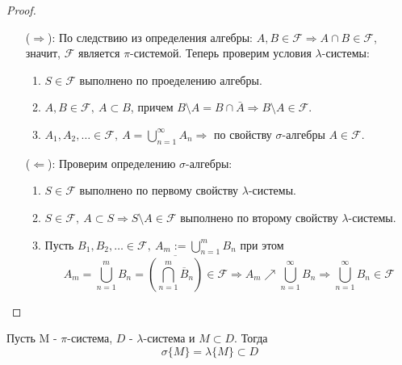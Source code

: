 \documentclass[a4paper, 12pt]{article}
\begin{document}
\begin{proof}\tab
    \begin{itemize}
        \item[($\Rightarrow$):] По следствию из определения алгебры: $A,B\in \mathcal{F} \Rightarrow A\cap B\in \mathcal{F}$, значит, $\mathcal{F}$ является $\pi$-системой. Теперь проверим условия $\lambda$-системы:
        \begin{enumerate}
            \item $S\in \mathcal{F}$ выполнено по проеделению алгебры.
            \item $A,B\in \mathcal{F},\ A\subset B$, причем $B\setminus A=B\cap \bar{A} \Rightarrow B\setminus A\in \mathcal{F}$.
            \item $A_1, A_2, \dots\in \mathcal{F},\ A=\bigcup\limits_{n=1}^{\infty}A_n \Rightarrow$ по свойству $\sigma$-алгебры $A\in \mathcal{F}$.
        \end{enumerate}
        \item[($\Leftarrow$):] Проверим определению $\sigma$-алгебры:
        \begin{enumerate}
            \item $S\in \mathcal{F}$ выполнено по первому свойству $\lambda$-системы.
            \item $S\in \mathcal{F},\ A\subset S \Rightarrow S\setminus A\in \mathcal{F}$ выполнено по второму свойству $\lambda$-системы.
            \item Пусть $B_1, B_2,\dots \in \mathcal{F},\ A_m:=\bigcup\limits_{n=1}^m B_n$ при этом
            \[A_m=\bigcup\limits_{n=1}^m B_n=\overline{\left(\bigcap\limits_{n=1}^m \overline{B}_n\right)}\in \mathcal{F} \Rightarrow A_m\nearrow \bigcup\limits_{n=1}^{\infty} B_n \Rightarrow \bigcup\limits_{n=1}^{\infty} B_n\in \mathcal{F}\]
        \end{enumerate}
    \end{itemize}
\end{proof}
\begin{theorem}
    Пусть M - $\pi$-система, $D$ - $\lambda$-система и $M\subset D$. Тогда 
    \[\sigma\{M\}=\lambda\{M\}\subset D\]
\end{theorem}
\end{document}
